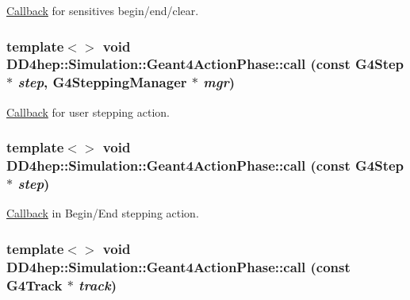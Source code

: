\hyperlink{class_d_d4hep_1_1_callback}{Callback} for sensitives begin/end/clear. \hypertarget{class_d_d4hep_1_1_simulation_1_1_geant4_action_phase_aa63d358a785e614c0087a24203bd1821}{
\subsubsection[{call}]{\setlength{\rightskip}{0pt plus 5cm}template$<$$>$ void DD4hep::Simulation::Geant4ActionPhase::call (const G4Step $\ast$ {\em step}, \/  G4SteppingManager $\ast$ {\em mgr})}}
\label{class_d_d4hep_1_1_simulation_1_1_geant4_action_phase_aa63d358a785e614c0087a24203bd1821}


\hyperlink{class_d_d4hep_1_1_callback}{Callback} for user stepping action. \hypertarget{class_d_d4hep_1_1_simulation_1_1_geant4_action_phase_a1ae70049ecebbd987436c44338081dfc}{
\subsubsection[{call}]{\setlength{\rightskip}{0pt plus 5cm}template$<$$>$ void DD4hep::Simulation::Geant4ActionPhase::call (const G4Step $\ast$ {\em step})}}
\label{class_d_d4hep_1_1_simulation_1_1_geant4_action_phase_a1ae70049ecebbd987436c44338081dfc}


\hyperlink{class_d_d4hep_1_1_callback}{Callback} in Begin/End stepping action. \hypertarget{class_d_d4hep_1_1_simulation_1_1_geant4_action_phase_af0f665dd43b54a635ebdb739c21f50e3}{
\subsubsection[{call}]{\setlength{\rightskip}{0pt plus 5cm}template$<$$>$ void DD4hep::Simulation::Geant4ActionPhase::call (const G4Track $\ast$ {\em track})}}
\label{class_d_d4hep_1_1_simulation_1_1_geant4_action_phase_af0f665dd43b54a635ebdb739c21f50e3}


